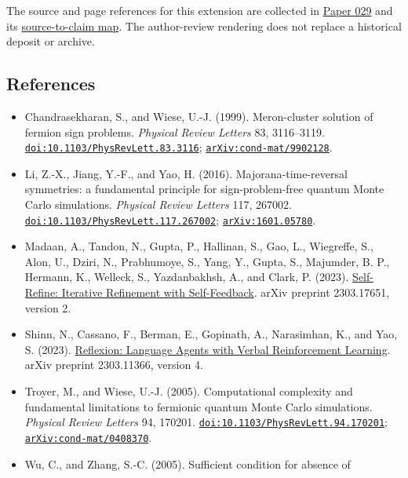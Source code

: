 \documentclass[
  11pt,
]{article}
\providecommand{\tightlist}{%
  \setlength{\itemsep}{0pt}\setlength{\parskip}{0pt}}
\begin{document}
The source and page references for this extension are collected in
\href{../029/paper.pdf}{Paper 029} and its
\href{../029/docs/source_to_claim_map.md}{source-to-claim map}. The
author-review rendering does not replace a historical deposit or
archive.

\subsection{References}\label{references}

\begin{itemize}
\tightlist
\item
  Chandrasekharan, S., and Wiese, U.-J. (1999). Meron-cluster solution
  of fermion sign problems. \emph{Physical Review Letters} 83,
  3116--3119.
  \href{https://doi.org/10.1103/PhysRevLett.83.3116}{\nolinkurl{doi:10.1103/PhysRevLett.83.3116}};
  \href{https://arxiv.org/abs/cond-mat/9902128}{\nolinkurl{arXiv:cond-mat/9902128}}.
\item
  Li, Z.-X., Jiang, Y.-F., and Yao, H. (2016). Majorana-time-reversal
  symmetries: a fundamental principle for sign-problem-free quantum
  Monte Carlo simulations. \emph{Physical Review Letters} 117, 267002.
  \href{https://doi.org/10.1103/PhysRevLett.117.267002}{\nolinkurl{doi:10.1103/PhysRevLett.117.267002}};
  \href{https://arxiv.org/abs/1601.05780}{\nolinkurl{arXiv:1601.05780}}.
\item
  Madaan, A., Tandon, N., Gupta, P., Hallinan, S., Gao, L., Wiegreffe,
  S., Alon, U., Dziri, N., Prabhumoye, S., Yang, Y., Gupta, S.,
  Majumder, B. P., Hermann, K., Welleck, S., Yazdanbakhsh, A., and
  Clark, P. (2023).
  \href{https://arxiv.org/abs/2303.17651v2}{Self-Refine: Iterative
  Refinement with Self-Feedback}. arXiv preprint 2303.17651, version 2.
\item
  Shinn, N., Cassano, F., Berman, E., Gopinath, A., Narasimhan, K., and
  Yao, S. (2023). \href{https://arxiv.org/abs/2303.11366v4}{Reflexion:
  Language Agents with Verbal Reinforcement Learning}. arXiv preprint
  2303.11366, version 4.
\item
  Troyer, M., and Wiese, U.-J. (2005). Computational complexity and
  fundamental limitations to fermionic quantum Monte Carlo simulations.
  \emph{Physical Review Letters} 94, 170201.
  \href{https://doi.org/10.1103/PhysRevLett.94.170201}{\nolinkurl{doi:10.1103/PhysRevLett.94.170201}};
  \href{https://arxiv.org/abs/cond-mat/0408370}{\nolinkurl{arXiv:cond-mat/0408370}}.
\item
  Wu, C., and Zhang, S.-C. (2005). Sufficient condition for absence of

\end{itemize}
\end{document}
